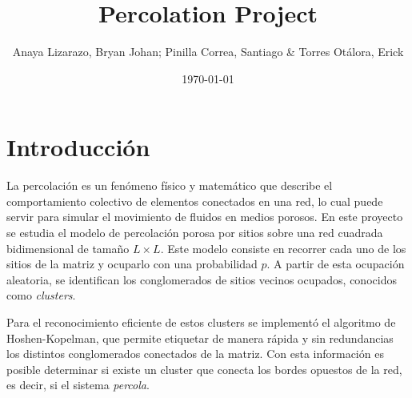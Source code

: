 \documentclass{article}
\title{Percolation Project}
\author{Anaya Lizarazo, Bryan Johan; Pinilla Correa, Santiago \& Torres Otálora, Erick}
\date{\today}
\begin{document}
 

\maketitle

\section{Introducción} 

La percolación es un fenómeno físico y matemático que describe el comportamiento colectivo de elementos conectados en una red, lo cual puede servir para simular el movimiento de fluidos en medios porosos. En este proyecto se estudia el modelo de percolación porosa por sitios sobre una red cuadrada bidimensional de tamaño \( L \times L \). Este modelo consiste en recorrer cada uno de los sitios de la matriz y ocuparlo con una probabilidad \( p \). A partir de esta ocupación aleatoria, se identifican los conglomerados de sitios vecinos ocupados, conocidos como \emph{clusters}.

Para el reconocimiento eficiente de estos clusters se implementó el algoritmo de Hoshen-Kopelman, que permite etiquetar de manera rápida y sin redundancias los distintos conglomerados conectados de la matriz. Con esta información es posible determinar si existe un cluster que conecta los bordes opuestos de la red, es decir, si el sistema \emph{percola}.
\end{document}
